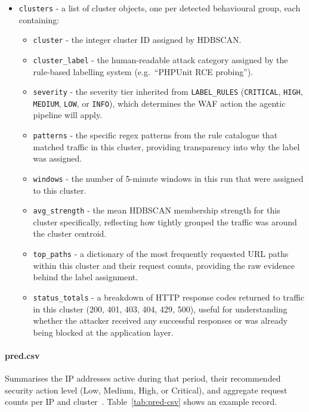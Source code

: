 \documentclass[12pt, a4paper]{report}   %
\begin{document}
\begin{itemize}
    \item \texttt{clusters} - a list of cluster objects, one per detected 
    behavioural group, each containing:
    \begin{itemize}
        \item \texttt{cluster} - the integer cluster ID assigned by HDBSCAN.
        \item \texttt{cluster\_label} - the human-readable attack category 
        assigned by the rule-based labelling system (e.g.\ ``PHPUnit RCE probing'').
        \item \texttt{severity} - the severity tier inherited from 
        \texttt{LABEL\_RULES} (\texttt{CRITICAL}, \texttt{HIGH}, \texttt{MEDIUM}, 
        \texttt{LOW}, or \texttt{INFO}), which determines the WAF action the 
        agentic pipeline will apply.
        \item \texttt{patterns} - the specific regex patterns from the rule 
        catalogue that matched traffic in this cluster, providing transparency 
        into why the label was assigned.
        \item \texttt{windows} - the number of 5-minute windows in this run 
        that were assigned to this cluster.
        \item \texttt{avg\_strength} - the mean HDBSCAN membership strength 
        for this cluster specifically, reflecting how tightly grouped the traffic 
        was around the cluster centroid.
        \item \texttt{top\_paths} - a dictionary of the most frequently 
        requested URL paths within this cluster and their request counts, 
        providing the raw evidence behind the label assignment.
        \item \texttt{status\_totals} - a breakdown of HTTP response codes 
        returned to traffic in this cluster (200, 401, 403, 404, 429, 500), 
        useful for understanding whether the attacker received any successful 
        responses or was already being blocked at the application layer.
    \end{itemize}
\end{itemize}


\paragraph{pred.csv}
Summarises the IP addresses active during that period, their recommended security
action level (Low, Medium, High, or Critical), and aggregate request counts per IP
and cluster~\cite{nist-800-53}. Table~\ref{tab:pred-csv} shows an example record.
\end{document}
